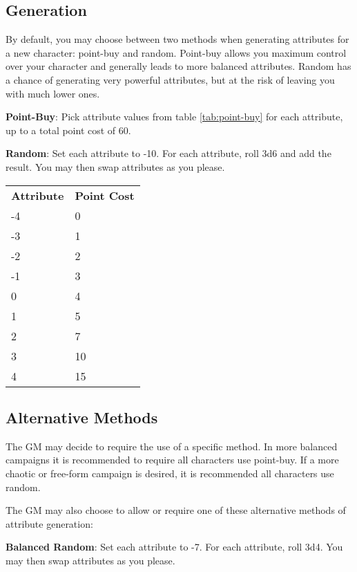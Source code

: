 \begin{multicols*}{2}
    \section{Generation}
    By default, you may choose between two methods when generating attributes
    for a new character: point-buy and random. Point-buy allows you maximum
    control over your character and generally leads to more balanced
    attributes. Random has a chance of generating very powerful attributes, but
    at the risk of leaving you with much lower ones.
    
    \textbf{Point-Buy}: Pick attribute values from table \ref{tab:point-buy}
    for each attribute, up to a total point cost of 60.

    \textbf{Random}: Set each attribute to -10. For each attribute, roll 3d6
    and add the result. You may then swap attributes as you please.

    {
        \setlength\parindent{0pt}
        \unclassedrowcolors
        \begin{tabularx}{0.5\textwidth}{l X}
            \textbf{Attribute} & \textbf{Point Cost} \\
            -4 & 0 \\
            -3 & 1 \\
            -2 & 2 \\
            -1 & 3 \\
            0 & 4 \\
            1 & 5 \\
            2 & 7 \\
            3 & 10 \\
            4 & 15 \\
        \end{tabularx}
        \label{tab:point-buy}
    }

    \subsection{Alternative Methods}
    The GM may decide to require the use of a specific method. In more balanced
    campaigns it is recommended to require all characters use point-buy. If a
    more chaotic or free-form campaign is desired, it is recommended all
    characters use random.

    The GM may also choose to allow or require  one of these alternative
    methods of attribute generation:
    
    \textbf{Balanced Random}: Set each attribute to -7. For each attribute,
    roll 3d4. You may then swap attributes as you please.


\end{multicols*}
